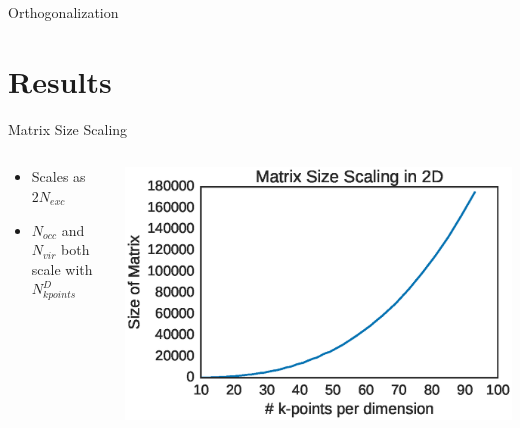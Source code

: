\documentclass[10pt]{beamer}
\begin{document}
{{{{{{{{{{{{\begin{frame}{Orthogonalization}
\end{frame}

\section{Results}

{%

\begin{frame}{Matrix Size Scaling}
	\begin{columns}[c] %
		\begin{column}{.4\textwidth}
			\begin{itemize}
				\item {Scales as $2N_{exc}$}
				\item {$N_{occ}$ and $N_{vir}$ both scale with $N_{kpoints}^D$}
			\end{itemize}				
		\end{column}
		\hfill
		\begin{column}{0.6\textwidth}
		    \begin{overprint}
			    \includegraphics[width=\linewidth]{../images/matscale.eps}

			\end{overprint}
		\end{column}	
	\end{columns}
\end{frame}

}}}}}}}}}}}}}
\end{document}
